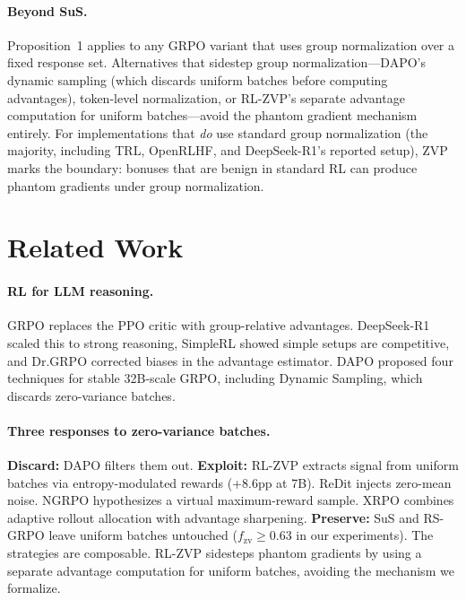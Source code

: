 \documentclass[10pt]{article}
\begin{document}
\paragraph{Beyond SuS.}
Proposition~1 applies to any GRPO variant that uses group normalization over a fixed response set. Alternatives that sidestep group normalization---DAPO's dynamic sampling (which discards uniform batches before computing advantages), token-level normalization, or RL-ZVP's separate advantage computation for uniform batches---avoid the phantom gradient mechanism entirely. For implementations that \emph{do} use standard group normalization (the majority, including TRL, OpenRLHF, and DeepSeek-R1's reported setup), ZVP marks the boundary: bonuses that are benign in standard RL can produce phantom gradients under group normalization.

\section{Related Work}
\label{sec:related_work}

\paragraph{RL for LLM reasoning.}
GRPO \citep{shao2024deepseekmath} replaces the PPO critic with group-relative advantages. DeepSeek-R1 \citep{guo2025deepseek} scaled this to strong reasoning, SimpleRL \citep{zeng2025simplerl} showed simple setups are competitive, and Dr.GRPO \citep{liu2025drgrpo} corrected biases in the advantage estimator. DAPO \citep{yu2025dapo} proposed four techniques for stable 32B-scale GRPO, including Dynamic Sampling, which discards zero-variance batches.

\paragraph{Three responses to zero-variance batches.}
\textbf{Discard:} DAPO filters them out.
\textbf{Exploit:} RL-ZVP \citep{zhong2025noprompt} extracts signal from uniform batches via entropy-modulated rewards (+8.6pp at 7B). ReDit \citep{cheng2025redit} injects zero-mean noise. NGRPO \citep{wang2025ngrpo} hypothesizes a virtual maximum-reward sample. XRPO \citep{li2025xrpo} combines adaptive rollout allocation with advantage sharpening.
\textbf{Preserve:} SuS and RS-GRPO \citep{yu2025rsgrpo} leave uniform batches untouched ($f_{\text{zv}} \geq 0.63$ in our experiments).
The strategies are composable. RL-ZVP sidesteps phantom gradients by using a separate advantage computation for uniform batches, avoiding the mechanism we formalize.
\end{document}

